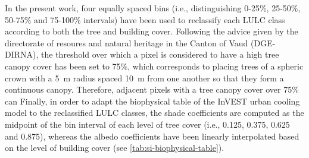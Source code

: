 \documentclass[10pt,letterpaper]{article}
\begin{document}
In the present work, four equally spaced bins (i.e., distinguishing 0-25\%, 25-50\%, 50-75\% and 75-100\% intervals) have been used to reclassify each LULC class according to both the tree and building cover.
Following the advice given by the directorate of resoures and natural heritage in the Canton of Vaud (DGE-DIRNA), the threshold over which a pixel is considered to have a high tree canopy cover has been set to 75\%, which corresponds to placing trees of a spheric crown with a 5~m radius spaced 10~m from one another so that they form a continuous canopy.
Therefore, adjacent pixels with a tree canopy cover over 75\% can 
Finally, in order to adapt the biophysical table of the InVEST urban cooling model to the reclassified LULC classes, the shade coefficients are computed as the midpoint of the bin interval of each level of tree cover (i.e., 0.125, 0.375, 0.625 and 0.875), whereas the albedo coefficients have been linearly interpolated based on the level of building cover (see \autoref{tab:si-biophysical-table}).





\end{document}
